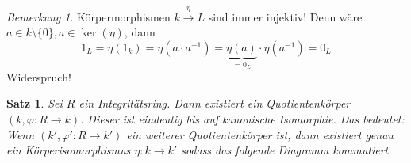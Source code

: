 \documentclass[a4paper,12pt,numbers=noenddot,parskip=full]{scrartcl}
\theoremstyle{dotless}
\newtheorem{theorem}{Satz}[section]
\theoremstyle{remark}
\newtheorem*{remark}{Bemerkung}
\begin{document}
	\begin{remark}
		Körpermorphismen $k \overset{\eta}{\to} L$ sind immer injektiv! Denn wäre $a \in k \setminus \{0\}, a \in \ker(\eta)$, dann
		\begin{equation*}
			1_L = \eta(1_k) = \eta(a \cdot a^{-1}) = \underbrace{\eta(a)}_{= 0_L} \cdot \eta (a^{-1})=0_L
		\end{equation*} 
		Widerspruch!
	\end{remark}

	\begin{theorem}
		Sei $R$ ein Integritätsring. Dann existiert ein Quotientenkörper $(k, \varphi: R \to k)$. Dieser ist eindeutig bis auf kanonische Isomorphie. Das bedeutet: Wenn $(k', \varphi': R \to k')$ ein weiterer Quotientenkörper ist, dann existiert genau ein Körperisomorphismus $\eta: k \to k'$ sodass das folgende Diagramm kommutiert.		
		\begin{center}
		\end{center}
	\end{theorem}
\end{document}
